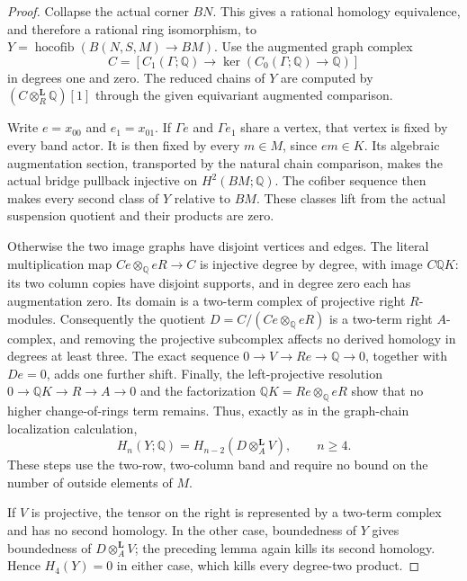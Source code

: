 \begin{proof}
Collapse the actual corner $BN$.  This gives a rational homology
equivalence, and therefore a rational ring isomorphism, to
$Y=\operatorname{hocofib}(B(N,S,M)\to BM)$.
Use the augmented graph complex
\[
 C=[C_1(\Gamma;\mathbb Q)\longrightarrow
           \ker(C_0(\Gamma;\mathbb Q)\to\mathbb Q)]
\]
in degrees one and zero.  The reduced chains of $Y$ are computed by
$(C\otimes_R^{\mathbf L}\mathbb Q)[1]$ through the given equivariant
augmented comparison.

Write $e=x_{00}$ and $e_1=x_{01}$.  If $\Gamma e$ and $\Gamma e_1$
share a vertex, that vertex is fixed by every band actor.  It is then
fixed by every $m\in M$, since $em\in K$.  Its algebraic augmentation
section, transported by the natural chain comparison, makes the actual
bridge pullback injective on $H^2(BM;\mathbb Q)$.  The cofiber sequence
then makes every second class of $Y$ relative to $BM$.  These classes
lift from the actual suspension quotient and their products are zero.

Otherwise the two image graphs have disjoint vertices and edges.  The
literal multiplication map $Ce\otimes_{\mathbb Q}eR\to C$ is injective
degree by degree, with image $C\mathbb QK$: its two column copies have
disjoint supports, and in degree zero each has augmentation zero.
Its domain is a two-term complex of projective right $R$-modules.
Consequently the quotient
$D=C/(Ce\otimes_{\mathbb Q}eR)$ is a two-term right $A$-complex, and
removing the projective subcomplex affects no derived homology in
degrees at least three.  The exact sequence
$0\to V\to Re\to\mathbb Q\to0$, together with $De=0$, adds one
further shift.  Finally, the left-projective resolution
$0\to\mathbb QK\to R\to A\to0$ and the factorization
$\mathbb QK=Re\otimes_{\mathbb Q}eR$ show that no higher
change-of-rings term remains.  Thus, exactly as in the graph-chain
localization calculation,
\[
 H_n(Y;\mathbb Q)=H_{n-2}(D\otimes_A^{\mathbf L}V),\qquad n\ge4.
\]
These steps use the two-row, two-column band and require no bound on
the number of outside elements of $M$.

If $V$ is projective, the tensor on the right is represented by a
two-term complex and has no second homology.  In the other case,
boundedness of $Y$ gives boundedness of $D\otimes_A^{\mathbf L}V$;
the preceding lemma again kills its second homology.  Hence $H_4(Y)=0$
in either case, which kills every degree-two product.
\end{proof}

